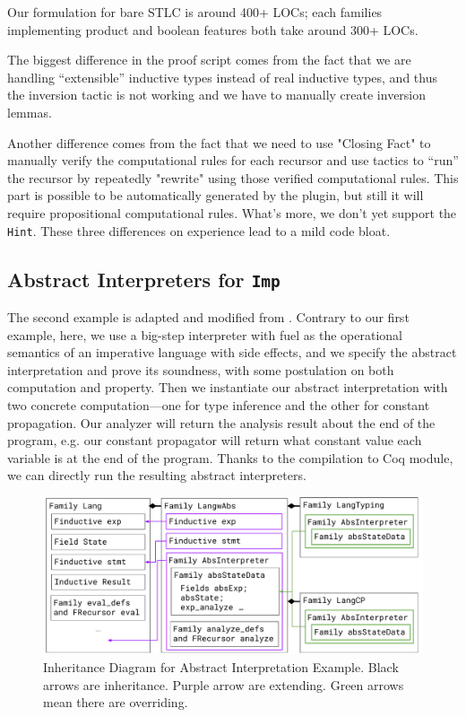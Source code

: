 Our formulation for bare STLC is around 400+ LOCs; each families implementing product and boolean features both take around 300+ LOCs. 

The biggest difference in the proof script comes from the fact that we
are handling ``extensible'' inductive types instead of real inductive
types, and thus the inversion tactic is not working and we have to manually
create inversion lemmas. 

Another difference comes from the fact that we need to use "Closing
Fact" to manually verify the computational rules for each recursor and
use tactics to ``run'' the recursor by repeatedly "rewrite" using those
verified computational rules. This part is possible to be automatically
generated by the plugin, but still it will require propositional 
computational rules.  What's more, we don't yet support the \texttt{Hint}. These three differences on experience lead to a mild code bloat. 

\subsection{Abstract Interpreters for \texttt{Imp}}
The second example is adapted and modified from \citet{zm2017}.
Contrary to our first example, here, we use a big-step interpreter with fuel
as the operational semantics of an imperative language with
side effects, and we specify the abstract interpretation and prove its
soundness, with some postulation on both computation and property. Then we instantiate our abstract interpretation with two concrete computation---one for type inference and the other for constant propagation. Our analyzer will return the analysis result about the end of the program, e.g. our constant propagator will return what constant value each variable is at the end of the program. Thanks to the compilation to Coq module, we can directly run the resulting
abstract interpreters.



\begin{figure}[!htb]
  \includegraphics[width=\columnwidth]{coqexmaple/Family-Lang-Imp3.pdf}
  \caption{Inheritance Diagram for Abstract Interpretation Example. Black arrows are inheritance. Purple arrow are extending. Green arrows mean there are overriding.}\label{fig:abstract-interpretation-example}
\end{figure}

